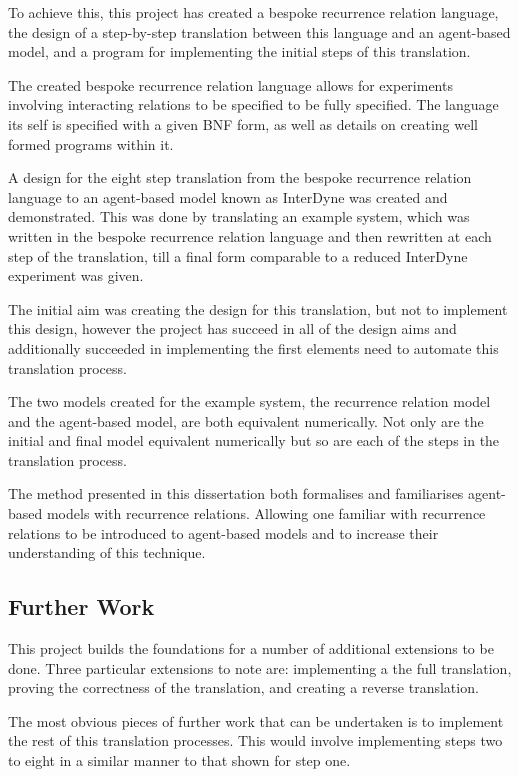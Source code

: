 \documentclass{article}
\begin{document}
To achieve this, this project has created a bespoke recurrence relation language, the design of a step-by-step translation between this language and an agent-based model, and a program for implementing the initial steps of this translation.  

The created bespoke recurrence relation language allows for experiments involving interacting relations to be specified to be fully specified. The language its self is specified with a given BNF form, as well as details on creating well formed programs within it. 

A design for the eight step translation from the bespoke recurrence relation language to an agent-based model known as InterDyne was created and demonstrated. This was done by translating an example system, which was written in the bespoke recurrence relation language and then rewritten at each step of the translation, till a final form comparable to a reduced InterDyne experiment was given.  

The initial aim was creating the design for this translation, but not to implement this design, however the project has succeed in all of the design aims and additionally succeeded in implementing the first elements need to automate this translation process.  

The two models created for the example system, the recurrence relation model and the agent-based model, are both equivalent numerically. Not only are the initial and final model equivalent numerically but so are each of the steps in the translation process. 

The method presented in this dissertation both formalises and familiarises agent-based models with recurrence relations. Allowing one familiar with recurrence relations to be introduced to agent-based models and to increase their understanding of this technique. 

\subsection{Further Work}
This project builds the foundations for a number of additional extensions to be done. Three particular extensions to note are: implementing a the full translation, proving the correctness of the translation, and creating a reverse translation.     

The most obvious pieces of further work that can be undertaken is to implement the rest of this translation processes. This would involve implementing steps two to eight in a similar manner to that shown for step one. 
\end{document}
